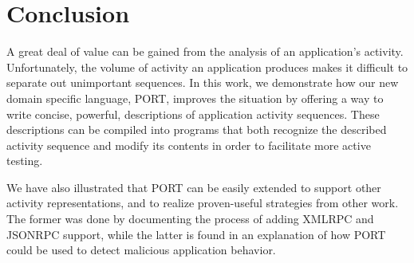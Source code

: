 \section{Conclusion}
\label{sec:Conclusion}
%
%

A great deal of value can be gained from the analysis of an application's
activity.
Unfortunately,
the volume of activity
an application produces
makes it difficult
to separate out
unimportant sequences.
In this work,
we demonstrate how our new domain specific language,
PORT, improves the situation
by offering
a way to write concise,
powerful,
descriptions of
application activity sequences.
These descriptions
can be compiled
into programs that
both recognize the described activity
sequence
and modify its contents in order to
facilitate more active testing.

We have also
illustrated that PORT
can be
easily extended
to support other activity
representations, and to 
realize proven-useful
strategies from other work.
The former was done
by documenting the process
of adding XMLRPC and JSONRPC support,
while the latter is found in
 an explanation
of how PORT could be used to
detect malicious application behavior.


